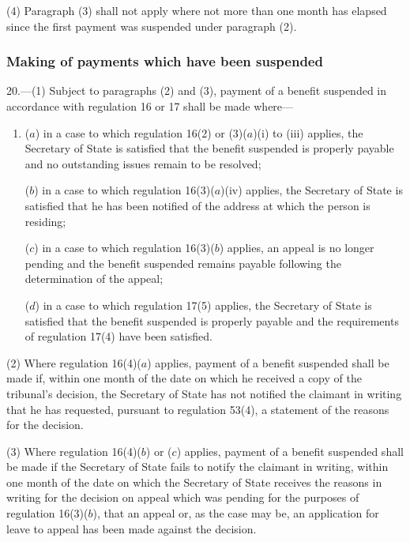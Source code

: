\documentclass[12pt,a4paper]{article}
\begin{document}
(4) Paragraph (3) shall not apply where not more than one month has elapsed since the first payment was suspended under paragraph (2).

\subsubsection[20. Making of payments which have been suspended]{Making of payments which have been suspended}

20.—(1) Subject to paragraphs (2) and (3), payment of a benefit suspended in accordance with regulation 16 
or 17  %
shall be made where—
\begin{enumerate}\item[]
($a$) in a case to which regulation 16(2) or (3)($a$)(i) to (iii) applies, the Secretary of State is satisfied that the benefit suspended is properly payable and no outstanding issues remain to be resolved;

($b$) in a case to which regulation 16(3)($a$)(iv) applies, the Secretary of State is satisfied that he has been notified of the address at which the person is residing;

($c$) in a case to which regulation 16(3)($b$) applies, an appeal is no longer pending and the benefit suspended remains payable following the determination of the appeal;

($d$) in a case to which regulation 17(5) applies, the Secretary of State is satisfied that the benefit suspended is properly payable and the requirements of regulation 17(4) have been satisfied.
\end{enumerate}

(2) Where regulation 16(4)($a$) applies, payment of a benefit suspended shall be made if, within one month of the date on which he received a copy of the tribunal’s decision, the Secretary of State has not notified the claimant in writing that he has requested, pursuant to regulation 53(4), a statement of the reasons for the decision.

(3) Where regulation 16(4)($b$) or ($c$) applies, payment of a benefit suspended shall be made if the Secretary of State fails to notify the claimant in writing, within one month of the date on which the Secretary of State receives the reasons in writing for the decision on appeal which was pending for the purposes of regulation 16(3)($b$), that an appeal or, as the case may be, an application for leave to appeal has been made against the decision.
\end{document}
